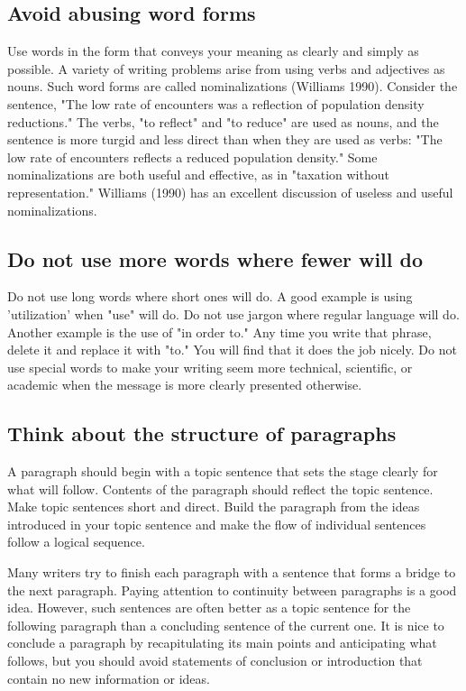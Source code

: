 \documentclass[11pt]{article}
\begin{document}
\subsection{Avoid abusing word forms}

Use words in the form that conveys your meaning as clearly and simply as possible. A variety of writing problems arise from using verbs and adjectives as nouns. Such word forms are called nominalizations (Williams 1990). Consider the sentence, "The low rate of encounters was a reflection of population density reductions." The verbs, "to reflect" and "to reduce" are used as nouns, and the sentence is more turgid and less direct than when they are used as verbs: "The low rate of encounters reflects a reduced population density." Some nominalizations are both useful and effective, as in "taxation without representation." Williams (1990) has an excellent discussion of useless and useful nominalizations.

\subsection{Do not use more words where fewer will do}
Do not use long words where short ones will do. A good example is using 'utilization' when "use" will do. Do not use jargon where regular language will do. Another example is the use of "in order to." Any time you write that phrase, delete it and replace it with "to." You will find that it does the job nicely. Do not use special words to make your writing seem more technical, scientific, or academic when the message is more clearly presented otherwise.


\subsection{Think about the structure of paragraphs}

A paragraph should begin with a topic sentence that sets the stage clearly for what will follow. Contents of the paragraph should reflect the topic sentence. Make topic sentences short and direct. Build the paragraph from the ideas introduced in your topic sentence and make the flow of individual sentences follow a logical sequence.

Many writers try to finish each paragraph with a sentence that forms a bridge to the next paragraph. Paying attention to continuity between paragraphs is a good idea. However, such sentences are often better as a topic sentence for the following paragraph than a concluding sentence of the current one. It is nice to conclude a paragraph by recapitulating its main points and anticipating what follows, but you should avoid statements of conclusion or introduction that contain no new information or ideas.
\end{document}
